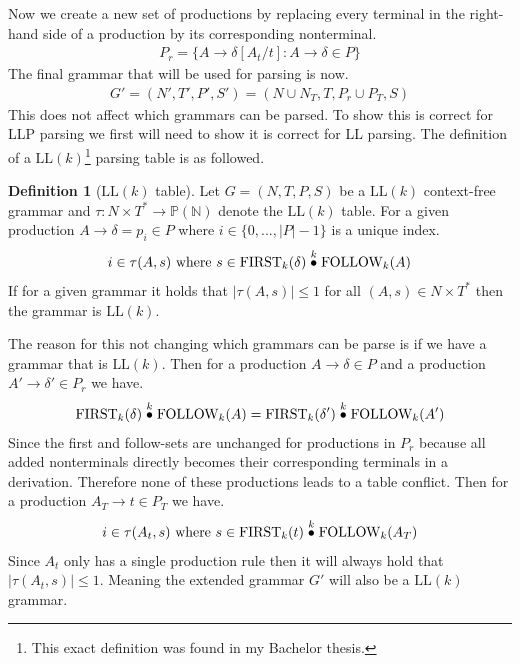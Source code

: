 \documentclass[a4paper,12pt]{article}
\newcommand{\truncprod}[1]{\stackrel{\mathclap{#1}}{\bullet}}
\newcommand\LL{\text{LL}}
\newcommand\FIRST{\text{FIRST}}
\newcommand\FOLLOW{\text{FOLLOW}}
\theoremstyle{definition}
\newtheorem{definition}{Definition}[section]
\begin{document}
Now we create a new set of productions by replacing every terminal in the right-hand side of a production by its corresponding nonterminal.
\begin{align*}
  P_r = \{A \to \delta[A_t/t] : A \to \delta \in P\}
\end{align*}
The final grammar that will be used for parsing is now.
\begin{align*}
  G' = (N', T', P', S') = (N \cup N_T, T, P_r \cup P_T, S)
\end{align*}
This does not affect which grammars can be parsed. To show this is correct for LLP parsing we first will need to show it is correct for LL parsing. The definition of a $\LL(k)$\footnote{This exact definition was found in my Bachelor thesis.} parsing table is as followed.
\begin{definition}[$\LL(k)$ table]
  Let $G = (N, T, P, S)$ be a $\LL(k)$ context-free grammar and $\tau : N \times T^* \to \mathbb{P}(\mathbb{N})$ denote the $\LL(k)$ table. For a given production $A \to \delta = p_i \in P$ where $i \in \{0, ..., |P| - 1\}$ is a unique index.
  \begin{gather*}
      i \in \tau(A, s) \text{ where } s \in \FIRST_k(\delta) \truncprod{k} \FOLLOW_k(A)
  \end{gather*}
  If for a given grammar it holds that $|\tau(A, s)| \leq 1$ for all $(A, s) \in N \times T^*$ then the grammar is $\LL(k)$.
\end{definition}
\noindent The reason for this not changing which grammars can be parse is if we have a grammar that is $\LL(k)$. Then for a production $A \to \delta \in P$ and a production $A' \to \delta' \in P_r$ we have.
\begin{align*}
  \FIRST_k(\delta) \truncprod{k} \FOLLOW_k(A) = \FIRST_k(\delta') \truncprod{k} \FOLLOW_k(A')
\end{align*}
Since the first and follow-sets are unchanged for productions in $P_r$ because all added nonterminals directly becomes their corresponding terminals in a derivation. Therefore none of these productions leads to a table conflict. Then for a production $A_T \to t \in P_T$ we have.
\begin{gather*}
  i \in \tau(A_t, s) \text{ where } s \in \FIRST_k(t) \truncprod{k} \FOLLOW_k(A_T)
\end{gather*}
Since $A_t$ only has a single production rule then it will always hold that $|\tau(A_t, s)| \leq 1$. Meaning the extended grammar $G'$ will also be a $\LL(k)$ grammar.
\end{document}
